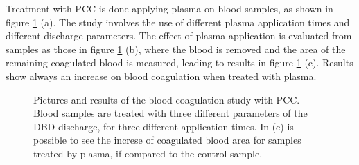 Treatment with PCC is done applying plasma on blood samples, as shown in figure \ref{fig:plasmaapp} (a). The study involves the use of different plasma application times and different discharge parameters. The effect of plasma application is evaluated from samples as those in figure \ref{fig:plasmaapp} (b), where the blood is removed and the area of the remaining coagulated blood is measured, leading to results in figure \ref{fig:plasmaapp} (c). Results show always an increase on blood coagulation when treated with plasma. 
\begin{figure}
 \centering
 \hfill
 \vspace{1cm}
 \caption{Pictures and results of the blood coagulation study with PCC. Blood samples are treated with three different parameters of the DBD discharge, for three different application times. In (c) is possible to see the increse of coagulated blood area for samples treated by plasma, if compared to the control sample.}
 \label{fig:plasmaapp}
\end{figure}


